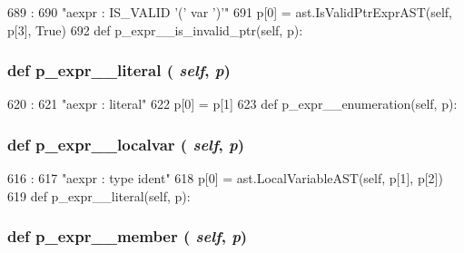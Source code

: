 \begin{DoxyCode}
689                                      :
690         "aexpr : IS_VALID '(' var ')'"
691         p[0] = ast.IsValidPtrExprAST(self, p[3], True)
692 
    def p_expr__is_invalid_ptr(self, p):
\end{DoxyCode}
\hypertarget{classslicc_1_1parser_1_1SLICC_a60b6aef0cc6effa1fe92344871861c82}{
\subsubsection[{p\_\-expr\_\-\_\-literal}]{\setlength{\rightskip}{0pt plus 5cm}def p\_\-expr\_\-\_\-literal ( {\em self}, \/   {\em p})}}
\label{classslicc_1_1parser_1_1SLICC_a60b6aef0cc6effa1fe92344871861c82}



\begin{DoxyCode}
620                                 :
621         "aexpr : literal"
622         p[0] = p[1]
623 
    def p_expr__enumeration(self, p):
\end{DoxyCode}
\hypertarget{classslicc_1_1parser_1_1SLICC_a62d10d37bd83d7333afb87c080046378}{
\subsubsection[{p\_\-expr\_\-\_\-localvar}]{\setlength{\rightskip}{0pt plus 5cm}def p\_\-expr\_\-\_\-localvar ( {\em self}, \/   {\em p})}}
\label{classslicc_1_1parser_1_1SLICC_a62d10d37bd83d7333afb87c080046378}



\begin{DoxyCode}
616                                  :
617         "aexpr : type ident"
618         p[0] = ast.LocalVariableAST(self, p[1], p[2])
619 
    def p_expr__literal(self, p):
\end{DoxyCode}
\hypertarget{classslicc_1_1parser_1_1SLICC_a368de9191588eda3ef23d5c70a925f2e}{
\subsubsection[{p\_\-expr\_\-\_\-member}]{\setlength{\rightskip}{0pt plus 5cm}def p\_\-expr\_\-\_\-member ( {\em self}, \/   {\em p})}}
\label{classslicc_1_1parser_1_1SLICC_a368de9191588eda3ef23d5c70a925f2e}



